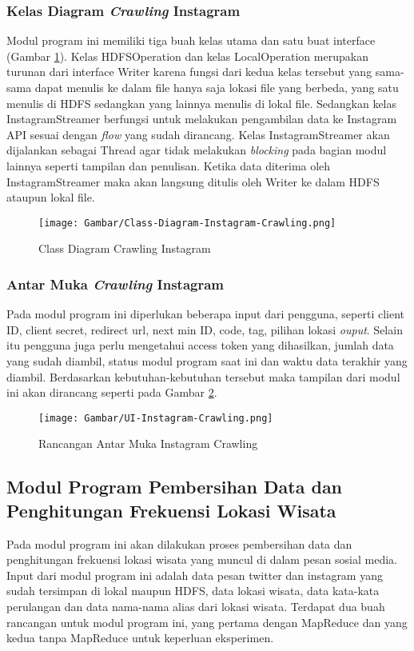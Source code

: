 \subsubsection{Kelas Diagram \textit{Crawling} Instagram}
Modul program ini memiliki tiga buah kelas utama dan satu buat interface (Gambar \ref{fig:class_crawling_instagram}). Kelas HDFSOperation dan kelas LocalOperation merupakan turunan dari interface Writer karena fungsi dari kedua kelas tersebut yang sama-sama dapat menulis ke dalam file hanya saja lokasi file yang berbeda, yang satu menulis di HDFS sedangkan yang lainnya menulis di lokal file. Sedangkan kelas InstagramStreamer berfungsi untuk melakukan pengambilan data ke Instagram API sesuai dengan \textit{flow} yang sudah dirancang. Kelas InstagramStreamer akan dijalankan sebagai Thread agar tidak melakukan \textit{blocking} pada bagian modul lainnya seperti tampilan dan penulisan. Ketika data diterima oleh InstagramStreamer maka akan langsung ditulis oleh Writer ke dalam HDFS ataupun lokal file.

\begin{figure}[H]
	\centering
	\texttt{[image: Gambar/Class-Diagram-Instagram-Crawling.png]}
	\caption[Class Diagram Crawling Instagram]{Class Diagram Crawling Instagram} 
	\label{fig:class_crawling_instagram}
\end{figure}

\subsubsection{Antar Muka \textit{Crawling} Instagram}
Pada modul program ini diperlukan beberapa input dari pengguna, seperti client ID, client secret, redirect url, next min ID, code, tag, pilihan lokasi \textit{ouput}. Selain itu pengguna juga perlu mengetahui access token yang dihasilkan, jumlah data yang sudah diambil, status modul program saat ini dan waktu data terakhir yang diambil. Berdasarkan kebutuhan-kebutuhan tersebut maka tampilan dari modul ini akan dirancang seperti pada Gambar \ref{fig:ui_instagram_crawling}.

\begin{figure}[H]
	\centering
	\texttt{[image: Gambar/UI-Instagram-Crawling.png]}
	\caption[Rancangan Antar Muka Instagram Crawling]{Rancangan Antar Muka Instagram Crawling} 
	\label{fig:ui_instagram_crawling}
\end{figure}


\subsection{Modul Program Pembersihan Data dan Penghitungan Frekuensi Lokasi Wisata}
Pada modul program ini akan dilakukan proses pembersihan data dan penghitungan frekuensi lokasi wisata yang muncul di dalam pesan sosial media. Input dari modul program ini adalah data pesan twitter dan instagram yang sudah tersimpan di lokal maupun HDFS, data lokasi wisata, data kata-kata perulangan dan data nama-nama alias dari lokasi wisata. Terdapat dua buah rancangan untuk modul program ini, yang pertama dengan MapReduce dan yang kedua tanpa MapReduce untuk keperluan eksperimen.

